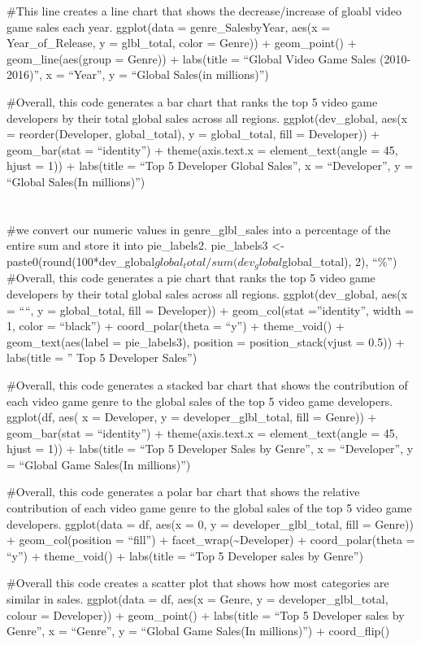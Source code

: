 \documentclass[
]{article}
\begin{document}
\#This line creates a line chart that shows the decrease/increase of
gloabl video game sales each year. ggplot(data = genre\_SalesbyYear,
aes(x = Year\_of\_Release, y = glbl\_total, color = Genre)) +
geom\_point() + geom\_line(aes(group = Genre)) + labs(title = ``Global
Video Game Sales (2010-2016)'', x = ``Year'', y = ``Global Sales\n(in
millions)'')

\#Overall, this code generates a bar chart that ranks the top 5 video
game developers by their total global sales across all regions.
ggplot(dev\_global, aes(x = reorder(Developer, global\_total), y =
global\_total, fill = Developer)) + geom\_bar(stat = ``identity'') +
theme(axis.text.x = element\_text(angle = 45, hjust = 1)) + labs(title =
``Top 5 Developer Global Sales'', x = ``Developer'', y = ``Global
Sales\n(In millions)'')

\hypertarget{section}{%
\section{}\label{section}}

\#we convert our numeric values in genre\_glbl\_sales into a percentage
of the entire sum and store it into pie\_labels2. pie\_labels3
\textless-
paste0(round(100*dev\_global\(global_total/sum(dev_global\)global\_total),
2), ``\%'') \#Overall, this code generates a pie chart that ranks the
top 5 video game developers by their total global sales across all
regions. ggplot(dev\_global, aes(x = ````, y = global\_total, fill =
Developer)) + geom\_col(stat =''identity'', width = 1, color =
``black'') + coord\_polar(theta = ``y'') + theme\_void() +
geom\_text(aes(label = pie\_labels3), position = position\_stack(vjust =
0.5)) + labs(title = '' Top 5 Developer Sales'')

\#Overall, this code generates a stacked bar chart that shows the
contribution of each video game genre to the global sales of the top 5
video game developers. ggplot(df, aes( x = Developer, y =
developer\_glbl\_total, fill = Genre)) + geom\_bar(stat = ``identity'')
+ theme(axis.text.x = element\_text(angle = 45, hjust = 1)) + labs(title
= ``Top 5 Developer Sales by Genre'', x = ``Developer'', y = ``Global
Game Sales\n(In millions)'')

\#Overall, this code generates a polar bar chart that shows the relative
contribution of each video game genre to the global sales of the top 5
video game developers. ggplot(data = df, aes(x = 0, y =
developer\_glbl\_total, fill = Genre)) + geom\_col(position = ``fill'')
+ facet\_wrap(\textasciitilde Developer) + coord\_polar(theta = ``y'') +
theme\_void() + labs(title = ``Top 5 Developer sales by Genre'')

\#Overall this code creates a scatter plot that shows how most
categories are similar in sales. ggplot(data = df, aes(x = Genre, y =
developer\_glbl\_total, colour = Developer)) + geom\_point() +
labs(title = ``Top 5 Developer sales by Genre'', x = ``Genre'', y =
``Global Game Sales\n(In millions)'') + coord\_flip()
\end{document}

